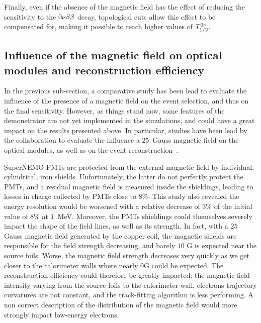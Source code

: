 Finally, even if the absence of the magnetic field has the effect of reducing the sensitivity to the $0\nu\beta\beta$ decay, topological cuts allow this effect to be compensated for, making it possible to reach higher values of $T_{1/2}^{0\nu}$.



\subsection{Influence of the magnetic field on optical modules and reconstruction efficiency}

In the previous sub-section, a comparative study has been lead to evaluate the influence of the presence of a magnetic field on the event selection, and thus on the final sensitivity.
However, as things stand now, some features of the demonstrator are not yet implemented in the simulations, and could have a great impact on the results presented above.
In particular, studies have been lead by the collaboration to evaluate the influence a $25$~Gauss magnetic field on the optical modules,  as well as on the event reconstruction~\cite{CalvezThesis}\cite{internal:magnetic_field}.

SuperNEMO PMTs are protected from the external magnetic field by individual, cylindrical, iron shields.
Unfortunately, the latter do not perfectly protect the PMTs, and a residual magnetic field is measured inside the shieldings, leading to losses in charge collected by PMTs close to $8\%$.
This study also revealed the energy resolution would be worsened with a relative decrease of $3\%$ of the initial value of $8\%$ at $1$~MeV.
Moreover, the PMTs shieldings could themselves severely impact the shape of the field lines, as well as its strength.
In fact, with a $25$ Gauss magnetic field generated by the copper coil, the magnetic shields are responsible for the field strength decreasing, and barely $10$ G is expected near the source foils.
Worse, the magnetic field strength decreases very quickly as we get closer to the calorimeter walls where nearly 0G could be expected.
The reconstruction efficiency could therefore be greatly impacted:
the magnetic field intensity varying from the source foils to the calorimeter wall, electrons trajectory curvatures are not constant, and the track-fitting algorithm is less performing.
A non correct description of the distribution of the magnetic field would more strongly impact low-energy electrons.

